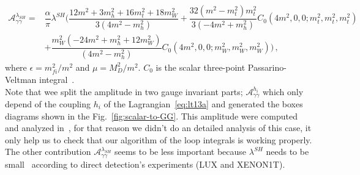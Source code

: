 \begin{align}
\mathcal{A}^{\lambda_{SH}}_{\gamma\gamma}
=&\dfrac{\alpha}{\pi}\lambda^{SH} \bigg(\dfrac{12 m^2 + 3 m_h^2 + 16 m_t^2 + 18 m_W^2}{3(4 m^2 -  m_h^2)} +\dfrac{32 (m^2 - m_t^2) m_t^2}{3 (-4 m^2 + m_h^2)}C_0(4m^2,0,0;m_t^2,m_t^2,m_t^2)\\
&+\dfrac{m_W^2 (-24 m^2 + m_h^2 + 12 m_W^2)}{(4 m^2 - m_h^2)}C_0(4m^2,0,0;m_W^2,m_W^2,m_W^2) \bigg)\,,
\end{align}
%
where $\epsilon = m_{fi}^2/m^2$ and $\mu = M_D^2/m^2$.
$C_0$ is the scalar three-point Passarino-Veltman integral~\cite{Passarino:1978jh}. \\
Note that wee split the amplitude in two gauge invariant parts; $\mathcal{A}^{h_i}_{\gamma\gamma}$ which only depend of the coupling $h_{i}$ of the Lagrangian~\eqref{eq:lt13a} and generated the boxes diagrams shown in the Fig.~\ref{fig:scalar-to-GG}. This amplitude were computed and analyzed in~\cite{Ibarra:2014qma}, for that reason we didn't do an detailed analysis of this case, it only help us to check that our algorithm of the loop integrals is working properly. 
The other contribution $\mathcal{A}^{\lambda_{SH}}_{\gamma\gamma}$ seems to be less important because $\lambda^{SH}$ needs to be small~\cite{Ibarra:2014qma} according to direct detection's experiments (LUX and XENON1T).


